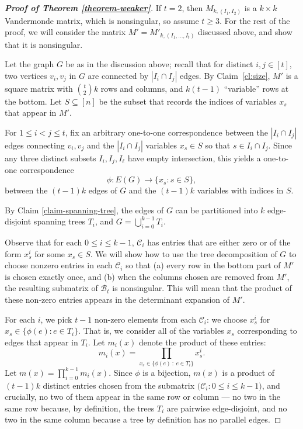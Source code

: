\documentclass[11pt]{article}
\newcommand\black[1]{{\color{black} #1}}
\newcommand{\ma}{\mathcal}
\begin{document}
\begin{proof}[\textbf{Proof of Theorem \ref{theorem-weaker}}]
If $t=2$, then $M_{k,(I_1,I_2)}$ is a $k\times k$ Vandermonde matrix, which is nonsingular, so assume $t\ge 3$.
For the rest of the proof, we will consider the matrix $M' = M'_{k,(I_1, \ldots, I_t)}$ discussed above, and show that it is nonsingular.

Let the graph $G$ be as in the discussion above;
recall that for distinct $i,j\in [t]$, two vertices $v_i,v_{j}$ in $G$ are connected by $|I_i\cap I_{j}|$ edges.
By Claim~\ref{cl:size}, $M'$ is a square matrix with ${t \choose 2}k$ rows and columns, and $k(t-1)$ ``variable'' rows at the bottom.  Let $S\subseteq [n]$ be the subset that records the indices of variables $x_s$ that appear in $M'$.

For $1\le i<j\le t$, fix an arbitrary one-to-one correspondence between the $|I_i \cap I_j|$ edges connecting $v_i,v_{j}$ and the $|I_i \cap I_j|$  variables $x_s \in S$ so that $s\in I_i\cap I_{j}$.
Since any three distinct subsets $I_i,I_{j},I_{\ell}$ have empty intersection, this yields a one-to-one correspondence $$\phi:E(G)\longrightarrow \{x_s:s\in S\},$$
between the $(t-1)k$ edges of $G$ and the $(t-1)k$ variables with indices in $S$.

By Claim \ref{claim-spanning-tree}, the edges of $G$ can be partitioned into $k$ edge-disjoint spanning trees $T_i$, and $G=\bigcup_{i=0}^{k-1} T_i$.

Observe that for each $0\le i\le k-1$, $\mathcal{C}_i$ has entries that are either zero or of the form $x_s^i$ for some $x_s \in S$.
We will show how to use the tree decomposition of $G$ to choose nonzero entries in each $\mathcal{C}_i$ so that (a) every row in the bottom part of $M'$ is chosen exactly once, and (b) when the columns chosen are removed from $M'$, the resulting submatrix of $\mathcal{B}_t$ is nonsingular.  This will mean that the product of these non-zero entries appears in the determinant expansion of $M'$.

For each $i$, we pick $t-1$ non-zero elements from each $\mathcal{C}_i$: we choose $x_s^i$ for  $x_s \in \{\phi(e) : e \in T_i\}$.   That is, we consider all of the variables $x_s$ corresponding to edges that appear in $T_i$.
Let $m_i(x)$ denote the product of these entries:
\[ m_i(x) = \prod_{x_s \in \{\phi(e)~:~ e \in T_i\}} x_s^i. \]
Let $m(x)=\prod_{i=0}^{k-1} m_i(x)$. Since $\phi$ is a bijection, $m(x)$ is a product of $(t-1)k$ distinct entries chosen from the submatrix $\big(\ma{C}_i:0\le i\le k-1\big)$, and crucially, no two of them appear in the same row or column \black{--- no two in the same row because, by definition, the trees $T_i$ are pairwise edge-disjoint, and no two in the same column because a tree by definition has no parallel edges.}


\end{proof}
\end{document}
